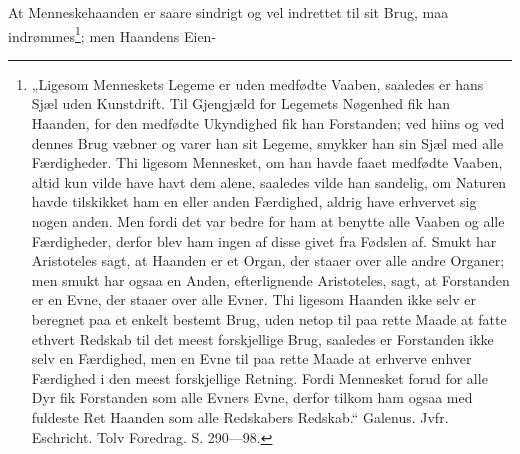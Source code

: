 \documentclass[12pt,a4paper]{book}
\begin{document}
At Menneskehaanden er saare sindrigt og vel indrettet til sit Brug, maa
indrømmes\footnote{„Ligesom Menneskets Legeme er uden medfødte Vaaben, saaledes
er hans Sjæl uden Kunstdrift. Til Gjengjæld for Legemets Nøgenhed fik han
Haanden, for den medfødte Ukyndighed fik han Forstanden; ved hiins og ved dennes
Brug væbner og varer han sit Legeme, smykker han sin Sjæl med alle Færdigheder.
Thi ligesom Mennesket, om han havde faaet medfødte Vaaben, altid kun vilde have
havt dem alene, saaledes vilde han sandelig, om Naturen havde tilskikket ham en
eller anden Færdighed, aldrig have erhvervet sig nogen anden. Men fordi det var
bedre for ham at benytte alle Vaaben og alle Færdigheder, derfor blev ham ingen
af disse givet fra Fødslen af. Smukt har Aristoteles sagt, at Haanden er et
Organ, der staaer over alle andre Organer; men smukt har ogsaa en Anden,
efterlignende Aristoteles, sagt, at Forstanden er en Evne, der staaer over alle
Evner. Thi ligesom Haanden ikke selv er beregnet paa et enkelt bestemt Brug,
uden netop til paa rette Maade at fatte ethvert Redskab til det meest
forskjellige Brug, saaledes er Forstanden ikke selv en Færdighed, men en
Evne til paa rette Maade at erhverve enhver Færdighed i den meest
forskjellige Retning. Fordi Mennesket forud for alle Dyr fik Forstanden
som alle Evners Evne, derfor tilkom ham ogsaa med fuldeste Ret Haanden
som alle Redskabers Redskab.“ Galenus. Jvfr. Eschricht. Tolv Foredrag.
S. 290---98.
}; men Haandens Eien-

\end{document}
